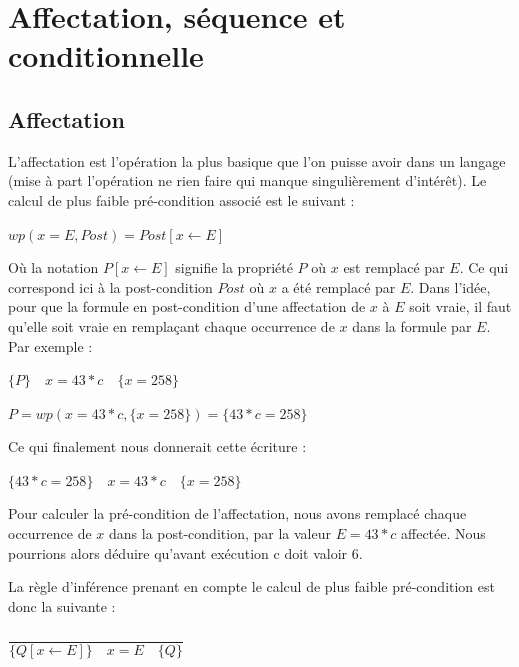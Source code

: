\documentclass[12pt,francais,]{scrbook}
\begin{document}
\section{Affectation, séquence et
conditionnelle}\label{affectation-suxe9quence-et-conditionnelle}

\subsection{Affectation}\label{affectation}

L'affectation est l'opération la plus basique que l'on puisse avoir dans
un langage (mise à part l'opération \og{}ne rien faire\fg{} qui manque
singulièrement d'intérêt). Le calcul de plus faible pré-condition
associé est le suivant :

\begin{center} \(wp(x = E , Post) = Post[x \leftarrow E]\) \end{center}

Où la notation \(P[x \leftarrow E]\) signifie \og{}la propriété \(P\) où
\(x\) est remplacé par \(E\)\fg{}. Ce qui correspond ici à \og{}la
post-condition \(Post\) où \(x\) a été remplacé par \(E\)\fg{}. Dans
l'idée, pour que la formule en post-condition d'une affectation de \(x\)
à \(E\) soit vraie, il faut qu'elle soit vraie en remplaçant chaque
occurrence de \(x\) dans la formule par \(E\). Par exemple :

\begin{center} \(\{P\}\quad x = 43*c \quad \{ x = 258 \}\) \end{center}

\begin{center} \(P = wp(x = 43*c , \{x = 258\}) = \{43*c = 258\}\)
\end{center}

Ce qui finalement nous donnerait cette écriture :

\begin{center} \(\{43*c = 258\}\quad x = 43*c\quad \{ x = 258 \}\)
\end{center}

Pour calculer la pré-condition de l'affectation, nous avons remplacé
chaque occurrence de \(x\) dans la post-condition, par la valeur
\(E = 43*c\) affectée. Nous pourrions alors déduire qu'avant exécution c
doit valoir 6.

La règle d'inférence prenant en compte le calcul de plus faible
pré-condition est donc la suivante :

\begin{center}
\(\dfrac{}{\{Q[x \leftarrow E] \}\quad x = E \quad\{ Q \}}\)
\end{center}
\end{document}
